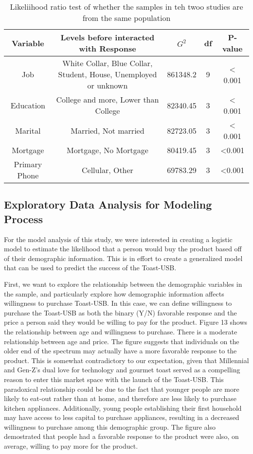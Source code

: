 \documentclass[]{article}
\begin{document}
\begin{table}[h!]
    \centering
    \begin{tabular}{ |c | c | c | c | c |}
    \hline
        Variable & Levels before interacted with Response & \(G^2\) & df & P-value \\ \hline
        Job & White Collar, Blue Collar, Student, House, Unemployed or unknown & 861348.2 & 9 & < 0.001 \\ \hline
        Education & College and more, Lower than College & 82340.45 & 3 & < 0.001 \\ \hline
        Marital & Married, Not married & 82723.05 & 3 & < 0.001 \\ \hline
        Mortgage & Mortgage, No Mortgage & 80419.45 & 3 & <0.001 \\ \hline
        Primary Phone & Cellular, Other & 69783.29 & 3 & <0.001 \\ \hline
    \end{tabular}
    \caption{Likeliihood ratio test of whether the samples in teh twoo studies are from the same population}
\end{table}

\hypertarget{exploratory-data-analysis-for-modeling-process}{%
\subsection{Exploratory Data Analysis for Modeling
Process}\label{exploratory-data-analysis-for-modeling-process}}

For the model analysis of this study, we were interested in creating a
logistic model to estimate the likelihood that a person would buy the
product based off of their demographic information. This is in effort to
create a generalized model that can be used to predict the success of
the Toast-USB.

First, we want to explore the relationship between the demographic
variables in the sample, and particularly explore how demographic
information affects willingness to purchase Toast-USB. In this case, we
can define willingness to purchase the Toast-USB as both the binary
(Y/N) favorable response and the price a person said they would be
willing to pay for the product. Figure 13 shows the relationship between
age and willingness to purchase. There is a moderate relationship
between age and price. The figure suggests that individuals on the older
end of the spectrum may actually have a more favorable response to the
product. This is somewhat contradictory to our expectation, given that
Millennial and Gen-Z's dual love for technology and gourmet toast served
as a compelling reason to enter this market space with the launch of the
Toast-USB. This paradoxical relationship could be due to the fact that
younger people are more likely to eat-out rather than at home, and
therefore are less likely to purchase kitchen appliances. Additionally,
young people establishing their first household may have access to less
capital to purchase appliances, resulting in a decreased willingness to
purchase among this demographic group. The figure also demostrated that
people had a favorable response to the product were also, on average,
willing to pay more for the product.
\end{document}
